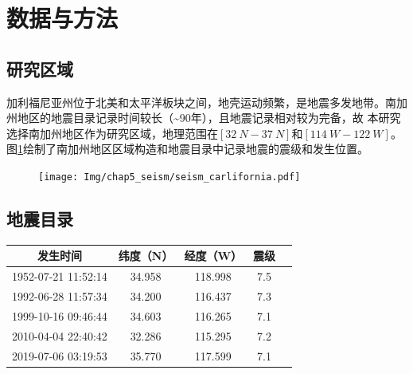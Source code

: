 \section{数据与方法}\label{sec:seism_data_method}

\subsection{研究区域}\label{sec:seism_area}

加利福尼亚州位于北美和太平洋板块之间，地壳运动频繁，是地震多发地带。南加州地区的地震目录记录时间较长（\sim 90年），且地震记录相对较为完备，故                                                                        本研究选择南加州地区作为研究区域，地理范围在$[\SI{32}{N}-\SI{37}{N}]$和$[\SI{114}{W}-\SI{122}{W}]$。
图\ref{fig:seism_california}绘制了南加州地区区域构造和地震目录中记录地震的震级和发生位置。

\begin{figure}[!htbp]
  \centering
  \texttt{[image: Img/chap5\_seism/seism\_carlifornia.pdf]}
  \label{fig:seism_california}
\end{figure}

\subsection{地震目录}\label{sec:seism_catolog}

\begin{table}[!htbp]
  \label{tab:seism_magnitude_7}
  \centering
  \footnotesize
  \begin{tabular}{ccccc} 
    \toprule
    发生时间 & 纬度（N） & 经度（W） & 震级 \\
    \midrule
    1952-07-21 11:52:14 & 34.958 & 118.998 & 7.5 \\
    1992-06-28 11:57:34 & 34.200 & 116.437 & 7.3 \\
    1999-10-16 09:46:44 & 34.603 & 116.265 & 7.1 \\
    2010-04-04 22:40:42 & 32.286 & 115.295 & 7.2 \\
    2019-07-06 03:19:53 & 35.770 & 117.599 & 7.1 \\
    \bottomrule
  \end{tabular}
\end{table}


